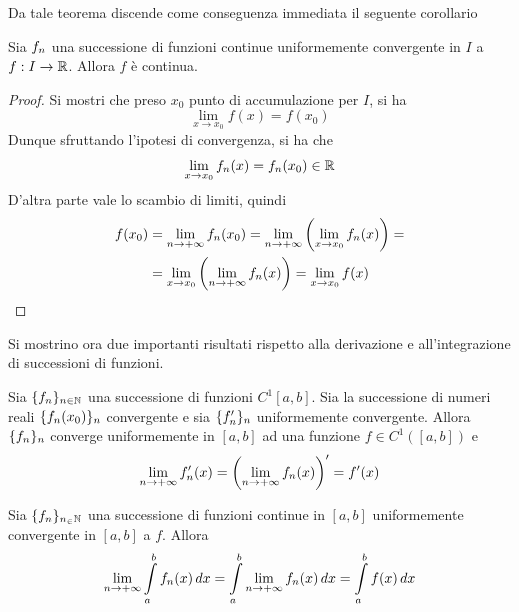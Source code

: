 Da tale teorema discende come conseguenza immediata il seguente corollario
\begin{corollary}
    Sia $f_n$ una successione di funzioni continue uniformemente convergente in $I$ a $f:I \to \mathbb{R}$. Allora $f$ è continua. 
\end{corollary}
\begin{proof}
    Si mostri che preso $x_0$ punto di accumulazione per $I$, si ha
    \begin{equation}
        \lim_{x \to x_0}{f(x)}= f(x_0)
    \end{equation}
    Dunque sfruttando l'ipotesi di convergenza, si ha che
    \begin{equation}
        \lim_{x \to x_0}{f_n(x)}= f_n(x_0) \in \mathbb{R}
    \end{equation}
    D'altra parte vale lo scambio di limiti, quindi
    \begin{equation}
    \begin{aligned}
          f(x_0) &=  \lim_{n \to +\infty}{f_n(x_0)}= \lim_{n \to +\infty}{\left(\lim_{x \to x_0}{f_n(x)}\right)}=\\
          &= \lim_{x \to x_0}{ \left( \lim_{n \to +\infty}{f_n(x)}\right)}=\lim_{x \to x_0}{f(x)} 
    \end{aligned}
    \end{equation}
   
\end{proof}
Si mostrino ora due importanti risultati rispetto alla derivazione e all'integrazione di successioni di funzioni.
\begin{theorem} \label{Teo: Passaggio al limite sotto al segno di derivata}
    Sia $\{f_n\}_{n\in\mathbb{N}}$ una successione di funzioni $C^1[a,b]$. Sia la successione di numeri reali $\{f_n(x_0)\}_n$ convergente e sia $\{f_n'\}_n$ uniformemente convergente. Allora $\{f_n\}_n$ converge uniformemente in $[a,b]$ ad una funzione $f \in C^1([a,b])$ e 
    \begin{equation}
        \lim_{n \to +\infty}{f_n'(x)}= \left(\lim_{n \to +\infty}{f_n(x)}\right)'=f'(x)
    \end{equation}
\end{theorem}
\begin{theorem} \label{Teo: Passaggio al limite sotto al segno di integrale}
Sia $\{f_n\}_{n_\in \mathbb{N}}$ una successione di funzioni continue in $[a,b]$ uniformemente convergente in $[a,b]$ a $f$. Allora
\begin{equation}
    \lim_{n \to +\infty}{\int\limits_{a}^{b}{f_n(x)}\,dx}=\int\limits_{a}^{b}{\lim_{n \to +\infty}{f_n(x)}\,dx}= \int\limits_{a}^{b}{f(x)}\,dx
\end{equation}
\end{theorem}
